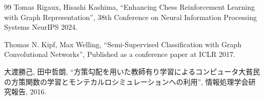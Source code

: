 \documentclass[a4j,dvipdfmx]{jarticle}
\begin{document}
\begin{Abstract}
\begin{thebibliography}{99}
 Tomas Rigaux, Hisashi Kashima, ``Enhancing Chess Reinforcement Learning with Graph Representation'', 38th Conference on Neural Information Processing Systems NeurIPS 2024.

 Thomas N. Kipf, Max Welling, ``Semi-Supervised Classification with Graph Convolutional Networks'', Published as a conference paper at ICLR 2017.

 大渡勝己, 田中哲朗, ``方策勾配を用いた教師有り学習によるコンピュータ大貧民の方策関数の学習とモンテカルロシミュレーションへの利用'', 情報処理学会研究報告, 2016.


  
\end{thebibliography}

\end{Abstract}
\end{document}
